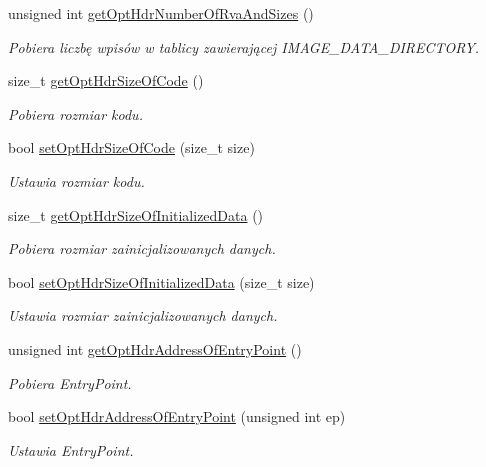 \begin{DoxyCompactItemize}
unsigned int \hyperlink{class_p_e_file_ac427597fb784a978b09094c8c8a461be}{get\-Opt\-Hdr\-Number\-Of\-Rva\-And\-Sizes} ()
\begin{DoxyCompactList}\small\item\em Pobiera liczbę wpisów w tablicy zawierającej I\-M\-A\-G\-E\-\_\-\-D\-A\-T\-A\-\_\-\-D\-I\-R\-E\-C\-T\-O\-R\-Y. \end{DoxyCompactList}\item 
size\-\_\-t \hyperlink{class_p_e_file_af8c30ffa5f05bea43df3a485b5390b10}{get\-Opt\-Hdr\-Size\-Of\-Code} ()
\begin{DoxyCompactList}\small\item\em Pobiera rozmiar kodu. \end{DoxyCompactList}\item 
bool \hyperlink{class_p_e_file_a307f2a1e6d75753e5ff46955b9f9871d}{set\-Opt\-Hdr\-Size\-Of\-Code} (size\-\_\-t size)
\begin{DoxyCompactList}\small\item\em Ustawia rozmiar kodu. \end{DoxyCompactList}\item 
size\-\_\-t \hyperlink{class_p_e_file_aa64129c136b77f772cf91c108e7e88a5}{get\-Opt\-Hdr\-Size\-Of\-Initialized\-Data} ()
\begin{DoxyCompactList}\small\item\em Pobiera rozmiar zainicjalizowanych danych. \end{DoxyCompactList}\item 
bool \hyperlink{class_p_e_file_ab53167f5c212c474b4be11da36ccd809}{set\-Opt\-Hdr\-Size\-Of\-Initialized\-Data} (size\-\_\-t size)
\begin{DoxyCompactList}\small\item\em Ustawia rozmiar zainicjalizowanych danych. \end{DoxyCompactList}\item 
unsigned int \hyperlink{class_p_e_file_a0598aa7de2b74460d06a16bfef7c96e9}{get\-Opt\-Hdr\-Address\-Of\-Entry\-Point} ()
\begin{DoxyCompactList}\small\item\em Pobiera Entry\-Point. \end{DoxyCompactList}\item 
bool \hyperlink{class_p_e_file_a2d741f3714914faf3aee402d712fde00}{set\-Opt\-Hdr\-Address\-Of\-Entry\-Point} (unsigned int ep)
\begin{DoxyCompactList}\small\item\em Ustawia Entry\-Point. \end{DoxyCompactList}\item 

\end{DoxyCompactItemize}
